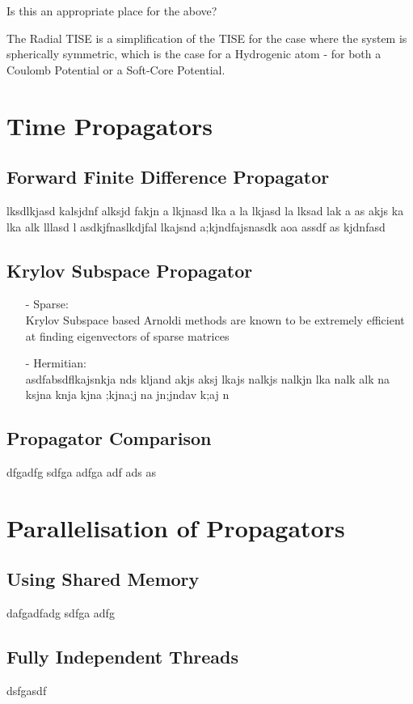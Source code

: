 Is this an appropriate place for the above?

The Radial TISE is a simplification of the TISE for the case where the system is spherically symmetric, which is the case for a Hydrogenic atom - for both a Coulomb Potential or a Soft-Core Potential.

\section{Time Propagators}

\subsection{Forward Finite Difference Propagator}
lksdlkjasd kalsjdnf alksjd fakjn a lkjnasd lka a la lkjasd la lksad lak a
as akjs ka lka alk lllasd l
asdkjfnaslkdjfal lkajsnd a;kjndfajsnasdk aoa 
assdf as kjdnfasd

\subsection{Krylov Subspace Propagator}
\begin{itemize}
\item[-]Sparse: \\ Krylov Subspace based Arnoldi methods are known to be extremely efficient at finding eigenvectors of sparse matrices
\item[-]Hermitian: \\ asdfabsdflkajsnkja nds kljand akjs aksj lkajs nalkjs nalkjn  lka nalk  alk na ksjna knja kjna ;kjna;j na jn;jndav k;aj n
\end{itemize}

\subsection{Propagator Comparison}
dfgadfg
sdfga adfga adf ads 
as 

\section{Parallelisation of Propagators}
\subsection{Using Shared Memory}
dafgadfadg sdfga adfg

\subsection{Fully Independent Threads}
dsfgasdf 

